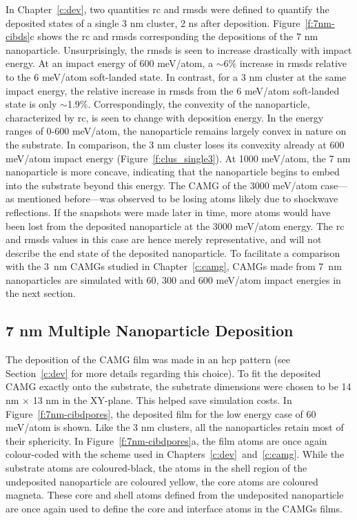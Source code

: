 In Chapter~\ref{c:dev}, two quantities \gls{rc} and \gls{rmsds} were defined to quantify the deposited states of a single 3 nm cluster, 2 ns after deposition. Figure~\ref{f:7nm-cibds}c shows the \gls{rc} and \gls{rmsds} corresponding the depositions of the 7 nm nanoparticle. Unsurprisingly, the \gls{rmsds} is seen to increase drastically with impact energy. At an impact energy of 600 meV/atom, a $\sim$6\% increase in \gls{rmsds} relative to the 6 meV/atom soft-landed state. In contrast, for a 3 nm cluster at the same impact energy, the relative increase in \gls{rmsds} from the 6 meV/atom soft-landed state is only $\sim$1.9\%. Correspondingly, the convexity of the nanoparticle, characterized by \gls{rc}, is seen to change with deposition energy. In the energy ranges of 0-600 meV/atom, the nanoparticle remains largely convex in nature on the substrate. In comparison, the 3 nm cluster loses its convexity already at 600 meV/atom impact energy (Figure~\ref{f:clus_single3}). At 1000 meV/atom, the 7 nm nanoparticle is more concave, indicating that the nanoparticle begins to embed into the substrate beyond this energy. The CAMG of the 3000 meV/atom case---as mentioned before---was observed to be losing atoms likely due to shockwave reflections. If the snapshots were made later in time, more atoms would have been lost from the deposited nanoparticle at the 3000 meV/atom energy. The \gls{rc} and \gls{rmsds} values in this case are hence merely representative, and will not describe the end state of the deposited nanoparticle. To facilitate a comparison with the \mbox{3 nm} CAMGs studied in Chapter~\ref{c:camg}, CAMGs made from \mbox{7 nm} nanoparticles are simulated with 60, 300 and 600 meV/atom impact energies in the next section. \par

\subsection{7 nm \cz Multiple Nanoparticle Deposition}
The deposition of the CAMG film was made in an \gls{hcp} pattern (see Section~\ref{c:dev} for more details regarding this choice). To fit the deposited CAMG exactly onto the substrate, the substrate dimensions were chosen to be 14 nm $\times$ 13 nm in the XY-plane. This helped save simulation costs. In Figure~\ref{f:7nm-cibdpores}, the deposited film for the low energy case of 60 meV/atom is shown. Like the 3 nm clusters, all the nanoparticles retain most of their sphericity. In Figure~\ref{f:7nm-cibdpores}a, the film atoms are once again colour-coded with the scheme used in Chapters~\ref{c:dev}~and~\ref{c:camg}. While the substrate atoms are coloured-black, the atoms in the shell region of the undeposited nanoparticle are coloured yellow, the core atoms are coloured magneta. These core and shell atoms defined from the undeposited nanoparticle are once again used to define the core and interface atoms in the CAMGs films. \par

